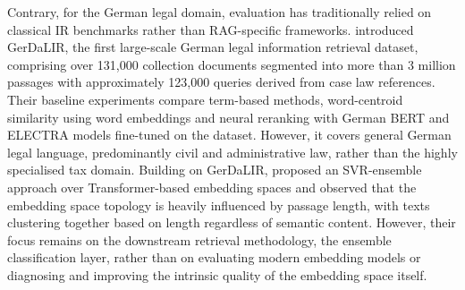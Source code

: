 Contrary, for the German legal domain,  evaluation has traditionally relied on classical \ac{IR} benchmarks rather than \ac{RAG}-specific frameworks. \citet{wrzalik_gerdalir_2021} introduced \ac{GerDaLIR}, the first large-scale German legal information retrieval dataset, comprising over 131,000 collection documents segmented into more than 3 million passages with approximately 123,000 queries derived from case law references. Their baseline experiments compare term-based methods, word-centroid similarity using word embeddings and neural reranking with German \ac{BERT}  and ELECTRA models fine-tuned on the dataset. However, it covers general German legal language, predominantly civil and administrative law, rather than the highly specialised tax domain.  Building on \ac{GerDaLIR}, \citet{bönisch2025finding} proposed an SVR-ensemble approach over Transformer-based embedding spaces and observed that the embedding space topology is heavily influenced by passage length, with texts clustering together based on length regardless of semantic content. However, their focus remains on the downstream retrieval methodology, the ensemble classification layer, rather than on evaluating modern embedding models or diagnosing and improving the intrinsic quality of the embedding space itself.